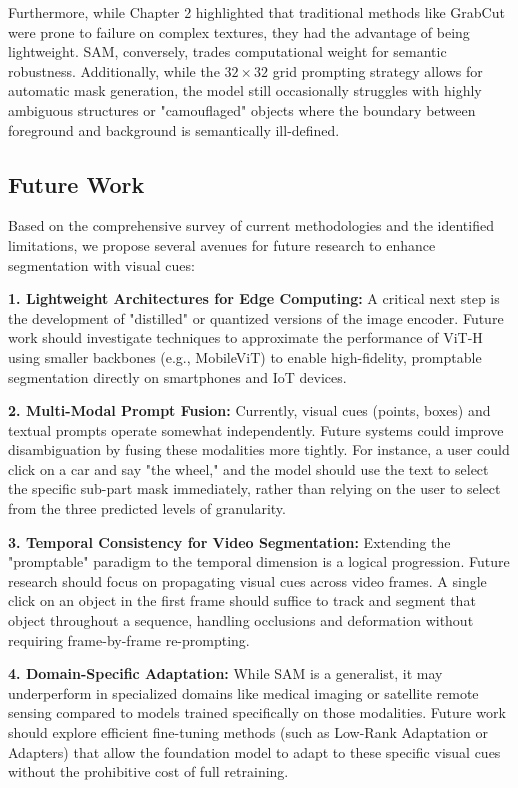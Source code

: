  Furthermore, while Chapter 2 highlighted that traditional methods like GrabCut were prone to failure on complex textures, they had the advantage of being lightweight. SAM, conversely, trades computational weight for semantic robustness. Additionally, while the $32 \times 32$ grid prompting strategy allows for automatic mask generation, the model still occasionally struggles with highly ambiguous structures or "camouflaged" objects where the boundary between foreground and background is semantically ill-defined.

\subsection{Future Work}
Based on the comprehensive survey of current methodologies and the identified limitations, we propose several avenues for future research to enhance segmentation with visual cues:

\textbf{1. Lightweight Architectures for Edge Computing:}
A critical next step is the development of "distilled" or quantized versions of the image encoder. Future work should investigate techniques to approximate the performance of ViT-H using smaller backbones (e.g., MobileViT) to enable high-fidelity, promptable segmentation directly on smartphones and IoT devices.

\textbf{2. Multi-Modal Prompt Fusion:}
Currently, visual cues (points, boxes) and textual prompts operate somewhat independently. Future systems could improve disambiguation by fusing these modalities more tightly. For instance, a user could click on a car and say "the wheel," and the model should use the text to select the specific sub-part mask immediately, rather than relying on the user to select from the three predicted levels of granularity.

\textbf{3. Temporal Consistency for Video Segmentation:}
Extending the "promptable" paradigm to the temporal dimension is a logical progression. Future research should focus on propagating visual cues across video frames. A single click on an object in the first frame should suffice to track and segment that object throughout a sequence, handling occlusions and deformation without requiring frame-by-frame re-prompting.

\textbf{4. Domain-Specific Adaptation:}
While SAM is a generalist, it may underperform in specialized domains like medical imaging or satellite remote sensing compared to models trained specifically on those modalities. Future work should explore efficient fine-tuning methods (such as Low-Rank Adaptation or Adapters) that allow the foundation model to adapt to these specific visual cues without the prohibitive cost of full retraining.